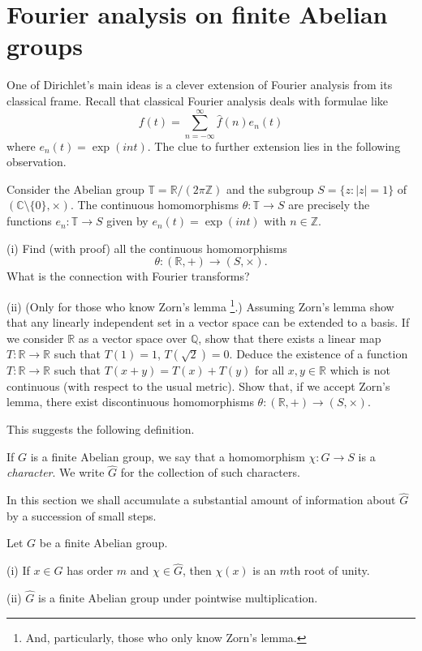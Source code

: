 \section{Fourier analysis on finite Abelian groups} One
of Dirichlet's main ideas is a clever extension of
Fourier analysis from its classical frame. Recall
that classical Fourier analysis deals with formulae
like
\[f(t)=\sum_{n=-\infty}^{\infty}\hat{f}(n)e_{n}(t)\]
where $e_{n}(t)=\exp(int)$. The clue to further extension
lies in the following observation.
\begin{lemma} Consider the Abelian group
${\mathbb T}={\mathbb R}/(2\pi{\mathbb Z})$ and the
subgroup $S=\{z:|z|=1\}$ of $({\mathbb C}\setminus\{0\},\times)$.
The continuous homomorphisms
$\theta:{\mathbb T}\rightarrow S$ are precisely
the functions $e_{n}:{\mathbb T}\rightarrow S$ given
by $e_{n}(t)=\exp(int)$ with $n\in{\mathbb Z}$.
\end{lemma}
\begin{exercise} (i) Find (with proof) all the
continuous homomorphisms
\[\theta:({\mathbb R},+)\rightarrow (S,\times).\]
What is the connection with Fourier transforms?

(ii) (Only for those who know Zorn's lemma%
\footnote{And, particularly, those who only know Zorn's lemma.}.)
Assuming Zorn's lemma show that any linearly independent
set in a vector space can be extended
to a basis. If we consider ${\mathbb R}$ as a vector
space over ${\mathbb Q}$, show that there exists
a linear map $T:{\mathbb R}\rightarrow{\mathbb R}$ such
that $T(1)=1$, $T(\surd 2)=0$. Deduce the existence
of a function $T:{\mathbb R}\rightarrow{\mathbb R}$
such that $T(x+y)=T(x)+T(y)$ for all $x,y\in {\mathbb R}$
which is not continuous (with respect to the usual metric).
Show that, if we accept Zorn's lemma, there exist
discontinuous homomorphisms
$\theta:({\mathbb R},+)\rightarrow (S,\times)$.
\end{exercise}

This suggests the following definition.
\begin{definition} If $G$ is a finite Abelian group,
we say that a homomorphism $\chi:G\rightarrow S$
is a \emph{character}. We write $\hat{G}$ for the
collection of such characters.
\end{definition}
In this section we shall accumulate a
substantial amount of information about $\hat{G}$
by a succession of small steps.

\begin{lemma} Let $G$ be a finite Abelian group.

(i) If $x\in G$ has order $m$ and $\chi\in\hat{G}$,
then $\chi(x)$ is an $m$th root of unity.

(ii) $\hat{G}$ is a finite Abelian group under
pointwise multiplication.
\end{lemma}

